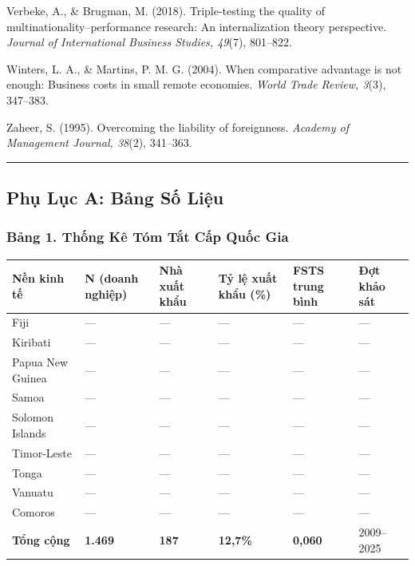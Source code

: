 \documentclass[12pt,a4paper]{article}
\begin{document}
Verbeke, A., \& Brugman, M. (2018). Triple-testing the quality of
multinationality--performance research: An internalization theory
perspective. \emph{Journal of International Business Studies, 49}(7),
801--822.

Winters, L. A., \& Martins, P. M. G. (2004). When comparative advantage
is not enough: Business costs in small remote economies. \emph{World
Trade Review, 3}(3), 347--383.

Zaheer, S. (1995). Overcoming the liability of foreignness.
\emph{Academy of Management Journal, 38}(2), 341--363.

\begin{center}\rule{0.5\linewidth}{0.5pt}\end{center}

\hypertarget{phux1ee5-lux1ee5c-a-bux1ea3ng-sux1ed1-liux1ec7u}{%
\subsection{Phụ Lục A: Bảng Số
Liệu}\label{phux1ee5-lux1ee5c-a-bux1ea3ng-sux1ed1-liux1ec7u}}

\hypertarget{bux1ea3ng-1-thux1ed1ng-kuxea-tuxf3m-tux1eaft-cux1ea5p-quux1ed1c-gia}{%
\subsubsection{Bảng 1. Thống Kê Tóm Tắt Cấp Quốc
Gia}\label{bux1ea3ng-1-thux1ed1ng-kuxea-tuxf3m-tux1eaft-cux1ea5p-quux1ed1c-gia}}

\begin{longtable}[]{@{}llllll@{}}
\toprule\noalign{}
Nền kinh tế & N (doanh nghiệp) & Nhà xuất khẩu & Tỷ lệ xuất khẩu (\%) &
FSTS trung bình & Đợt khảo sát \\
\midrule\noalign{}
\endhead
\bottomrule\noalign{}
\endlastfoot
Fiji & --- & --- & --- & --- & --- \\
Kiribati & --- & --- & --- & --- & --- \\
Papua New Guinea & --- & --- & --- & --- & --- \\
Samoa & --- & --- & --- & --- & --- \\
Solomon Islands & --- & --- & --- & --- & --- \\
Timor-Leste & --- & --- & --- & --- & --- \\
Tonga & --- & --- & --- & --- & --- \\
Vanuatu & --- & --- & --- & --- & --- \\
Comoros & --- & --- & --- & --- & --- \\
\textbf{Tổng cộng} & \textbf{1.469} & \textbf{187} & \textbf{12,7\%} &
\textbf{0,060} & 2009--2025 \\
\end{longtable}
\end{document}
